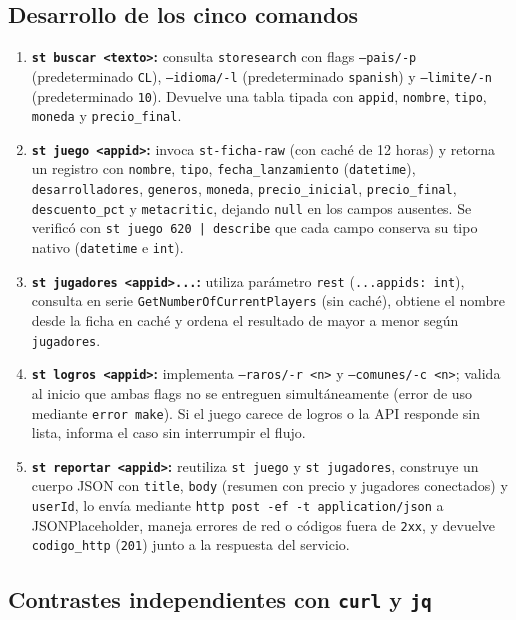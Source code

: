 \documentclass[11pt,a4paper]{article}
\begin{document}
\subsection{Desarrollo de los cinco comandos}
\begin{enumerate}
    \item \textbf{\texttt{st buscar <texto>}:} consulta \texttt{storesearch} con flags \texttt{--pais/-p} (predeterminado \texttt{CL}), \texttt{--idioma/-l} (predeterminado \texttt{spanish}) y \texttt{--limite/-n} (predeterminado \texttt{10}). Devuelve una tabla tipada con \texttt{appid}, \texttt{nombre}, \texttt{tipo}, \texttt{moneda} y \texttt{precio\_final}.
    \item \textbf{\texttt{st juego <appid>}:} invoca \texttt{st-ficha-raw} (con caché de 12 horas) y retorna un registro con \texttt{nombre}, \texttt{tipo}, \texttt{fecha\_lanzamiento} (\texttt{datetime}), \texttt{desarrolladores}, \texttt{generos}, \texttt{moneda}, \texttt{precio\_inicial}, \texttt{precio\_final}, \texttt{descuento\_pct} y \texttt{metacritic}, dejando \texttt{null} en los campos ausentes. Se verificó con \texttt{st juego 620 | describe} que cada campo conserva su tipo nativo (\texttt{datetime} e \texttt{int}).
    \item \textbf{\texttt{st jugadores <appid>...}:} utiliza parámetro \texttt{rest} (\texttt{...appids: int}), consulta en serie \texttt{GetNumberOfCurrentPlayers} (sin caché), obtiene el nombre desde la ficha en caché y ordena el resultado de mayor a menor según \texttt{jugadores}.
    \item \textbf{\texttt{st logros <appid>}:} implementa \texttt{--raros/-r <n>} y \texttt{--comunes/-c <n>}; valida al inicio que ambas flags no se entreguen simultáneamente (error de uso mediante \texttt{error make}). Si el juego carece de logros o la API responde sin lista, informa el caso sin interrumpir el flujo.
    \item \textbf{\texttt{st reportar <appid>}:} reutiliza \texttt{st juego} y \texttt{st jugadores}, construye un cuerpo JSON con \texttt{title}, \texttt{body} (resumen con precio y jugadores conectados) y \texttt{userId}, lo envía mediante \texttt{http post -ef -t application/json} a JSONPlaceholder, maneja errores de red o códigos fuera de \texttt{2xx}, y devuelve \texttt{codigo\_http} (\texttt{201}) junto a la respuesta del servicio.
\end{enumerate}

\subsection{Contrastes independientes con \texttt{curl} y \texttt{jq}}
\end{document}
